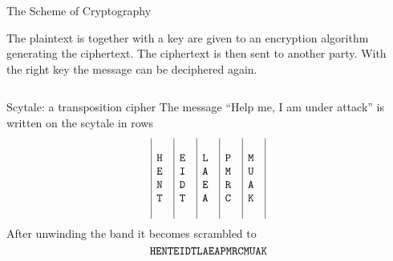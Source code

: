 \documentclass[final,hyperref={pdfpagelabels=false}]{beamer}
\begin{document}
\begin{frame}{}
\begin{columns}[t]
\begin{column}{.48\linewidth}
\begin{block}{\large The Scheme of Cryptography}
\begin{figure}
    \end{figure}
    The plaintext is together with a key are given to an encryption algorithm generating the ciphertext. The ciphertext is then sent to another party. With the right key the  message can be deciphered again.
    \end{block}
    \end{column}
    \begin{column}{.48\linewidth}
      \begin{block}{\large }
      \end{block}
    \end{column}
    \end{columns}
    \vfill
    \vfill
    \begin{block}{\large }
    \end{block}
    \vfill
    \begin{columns}[t]
      \begin{column}{.48\linewidth}
        \begin{block}{Scytale: a transposition cipher}
        The message ``Help me, I am under attack'' is written on the scytale in rows
        \begin{equation*}
        \begin{array}{|c|c|c|c|c|}
              &    &    &    &   \\
           \text{\tt H }  & \text{\tt E }  & \text{\tt L }  & \text{\tt P }  & \text{\tt M } \\
           \text{\tt E }  & \text{\tt I }  & \text{\tt A }  & \text{\tt M }  & \text{\tt U } \\
           \text{\tt N }  & \text{\tt D }  & \text{\tt E }  & \text{\tt R }  & \text{\tt A } \\
           \text{\tt T }  & \text{\tt T }  & \text{\tt A }  & \text{\tt C }  & \text{\tt K } \\   
              &    &    &    &   
        \end{array}
        \end{equation*}
        After unwinding the band it becomes scrambled to
        \begin{equation*}
          \text{\tt HENTEIDTLAEAPMRCMUAK}
        \end{equation*}
        \end{block}


\end{column}
\end{columns}
\end{frame}
\end{document}

